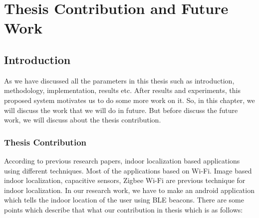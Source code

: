 
\chapter{Thesis Contribution and Future Work} %
\label{Chapter1}

\section{Introduction}
As we have discussed all the parameters in this thesis such as introduction, methodology, implementation, results etc. After results and experiments, this proposed system motivates us to do some more work on it. So, in this chapter, we will discuss the work that we will do in future. But before discuss the future work, we will discuss about the thesis contribution.

\subsection{Thesis Contribution}
 According to previous research papers, indoor localization based applications using different techniques. Most of the applications based on Wi-Fi. Image based indoor localization, capacitive sensors, Zigbee Wi-Fi are previous technique for indoor localization. In our research work, we have to make an android application which tells the indoor location of the user using BLE beacons. There are some points which describe that what our contribution in thesis which is as follows:

